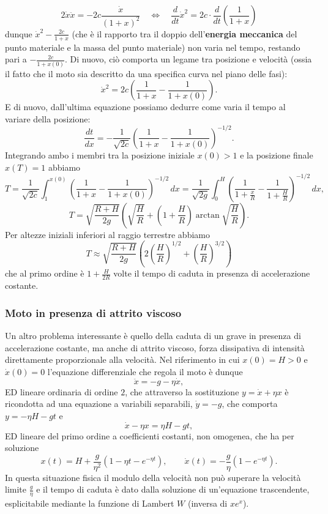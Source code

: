 \documentclass[a4paper,twoside]{article}
\theoremstyle{definition}
\numberwithin{theorem}{section}
\begin{document}
$$ 2\dot{x}\ddot{x} = -2c\frac{\dot{x}}{(1+x)^2}\quad\Longleftrightarrow\quad \frac{d}{dt}\dot{x}^2 = 2c\cdot\frac{d}{dt}\left(\frac{1}{1+x}\right) $$
dunque $\dot{x}^2-\frac{2c}{1+x}$ (che è il rapporto tra il doppio dell'\textbf{energia meccanica} del punto materiale e la massa del punto materiale) non varia nel tempo, restando pari a $-\frac{2c}{1+x(0)}$. Di nuovo, ciò comporta un legame tra posizione e velocità (ossia il fatto che il moto sia descritto da una specifica curva nel piano delle fasi):
$$ \dot{x}^2 = 2c\left(\frac{1}{1+x}-\frac{1}{1+x(0)}\right). $$
E di nuovo, dall'ultima equazione possiamo dedurre come varia il tempo al variare della posizione:
$$ \frac{dt}{dx} = -\frac{1}{\sqrt{2c}}\left(\frac{1}{1+x}-\frac{1}{1+x(0)}\right)^{-1/2}. $$
Integrando ambo i membri tra la posizione iniziale $x(0)>1$ e la posizione finale $x(T)=1$ abbiamo 
$$ T = \frac{1}{\sqrt{2c}}\int_{1}^{x(0)}\left(\frac{1}{1+x}-\frac{1}{1+x(0)}\right)^{-1/2}\,dx=\frac{1}{\sqrt{2g}}\int_{0}^{H}\left(\frac{1}{1+\frac{x}{R}}-\frac{1}{1+\frac{H}{R}}\right)^{-1/2}\,dx,$$
$$T=\sqrt{\frac{R+H}{2g}}\left(\sqrt{\frac{H}{R}}+\left(1+\frac{H}{R}\right)\arctan\sqrt{\frac{H}{R}}\right). $$
Per altezze iniziali inferiori al raggio terrestre abbiamo
$$T\approx \sqrt{\frac{R+H}{2g}}\left(2\left(\frac{H}{R}\right)^{1/2}+\left(\frac{H}{R}\right)^{3/2}\right) $$
che al primo ordine è $1+\frac{H}{2R}$ volte il tempo di caduta in presenza di accelerazione costante.

\subsubsection{Moto in presenza di attrito viscoso}
Un altro problema interessante è quello della caduta di un grave in presenza di accelerazione costante, ma anche di attrito viscoso, forza dissipativa di intensità direttamente proporzionale alla velocità. Nel riferimento in cui ${x(0)=H>0}$ e $\dot{x}(0)=0$ l'equazione differenziale che regola il moto è dunque 
$$ \ddot{x} = -g-\eta \dot{x}, $$
ED lineare ordinaria di ordine $2$, che attraverso la sostituzione $y=\dot{x}+\eta x$ è ricondotta ad una equazione a variabili separabili, $\dot{y}=-g$, che comporta $y=-\eta H-gt$ e 
$$ \dot{x}-\eta x = \eta H -gt, $$
ED lineare del primo ordine a coefficienti costanti, non omogenea, che ha per soluzione 
$$ x(t) = H + \frac{g}{\eta^2}\left(1-\eta t-e^{-\eta t}\right),\qquad \dot{x}(t)=-\frac{g}{\eta}\left(1-e^{-\eta t}\right). $$
In questa situazione fisica il modulo della velocità non può superare la velocità limite $\frac{g}{\eta}$ e il tempo di caduta è dato dalla soluzione di un'equazione trascendente, esplicitabile mediante la funzione di Lambert $W$ (inversa di $xe^x$).
\end{document}
